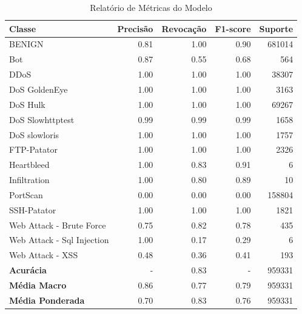     \begin{table}[H]
    \centering
    \small
    \begin{tabular}{lrrrr}
        \hline
        Classe                     & Precisão & Revocação & F1-score & Suporte \\
        \hline
        BENIGN                     & 0.81     & 1.00      & 0.90     & 681014  \\
        Bot                        & 0.87     & 0.55      & 0.68     & 564     \\
        DDoS                       & 1.00     & 1.00      & 1.00     & 38307   \\
        DoS GoldenEye              & 1.00     & 1.00      & 1.00     & 3163    \\
        DoS Hulk                   & 1.00     & 1.00      & 1.00     & 69267   \\
        DoS Slowhttptest           & 0.99     & 0.99      & 0.99     & 1658    \\
        DoS slowloris              & 1.00     & 1.00      & 1.00     & 1757    \\
        FTP-Patator                & 1.00     & 1.00      & 1.00     & 2326    \\
        Heartbleed                 & 1.00     & 0.83      & 0.91     & 6       \\
        Infiltration               & 1.00     & 0.80      & 0.89     & 10      \\
        PortScan                   & 0.00     & 0.00      & 0.00     & 158804  \\
        SSH-Patator                & 1.00     & 1.00      & 1.00     & 1821    \\
        Web Attack - Brute Force   & 0.75     & 0.82      & 0.78     & 435     \\
        Web Attack - Sql Injection & 1.00     & 0.17      & 0.29     & 6       \\
        Web Attack - XSS           & 0.48     & 0.36      & 0.41     & 193     \\
        \hline
        \textbf{Acurácia}          & -        & 0.83      & -        & 959331  \\
        \textbf{Média Macro}       & 0.86     & 0.77      & 0.79     & 959331  \\
        \textbf{Média Ponderada}   & 0.70     & 0.83      & 0.76     & 959331  \\
        \hline
    \end{tabular}
    \caption{Relatório de Métricas do Modelo}
    \label{table:rf_sem_portscan_metricas}
\end{table}